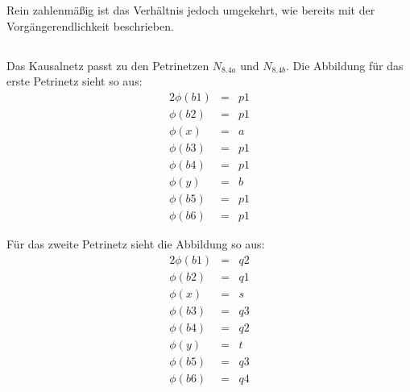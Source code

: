 \documentclass[10pt,a4paper,oneside,ngerman,numbers=noenddot]{scrartcl}
\begin{document}
	Rein zahlenmäßig ist das Verhältnis jedoch umgekehrt, wie bereits mit der Vorgängerendlichkeit beschrieben.
	\subsection{}
	Das Kausalnetz passt zu den Petrinetzen \(N_{8.4a}\) und \(N_{8.4b}\). Die Abbildung für das erste Petrinetz sieht so aus:
	\begin{alignat*}{2}
		\phi(b1) &=& p1 \\
		\phi(b2) &=& p1 \\
		\phi(x) &=& a \\
		\phi(b3) &=& p1 \\
		\phi(b4) &=& p1 \\
		\phi(y) &=& b \\
		\phi(b5) &=& p1 \\
		\phi(b6) &=& p1
	\end{alignat*}
	
	Für das zweite Petrinetz sieht die Abbildung so aus:
	\begin{alignat*}{2}
		\phi(b1) &=& q2 \\
		\phi(b2) &=& q1 \\
		\phi(x) &=& s \\
		\phi(b3) &=& q3 \\
		\phi(b4) &=& q2 \\
		\phi(y) &=& t \\
		\phi(b5) &=& q3 \\
		\phi(b6) &=& q4
	\end{alignat*}
\end{document}
